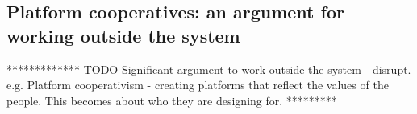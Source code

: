 \subsection{Platform cooperatives: an argument for working outside the system}

************* TODO Significant argument to work outside the system - disrupt. e.g. Platform cooperativism - creating platforms that reflect the values of the people. This becomes about who they are designing for. *********